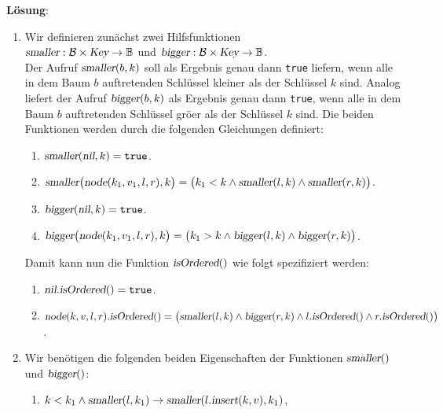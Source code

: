 \documentclass{article}
\newcommand{\solution}{\vspace*{0.2cm}

\noindent
\textbf{L\"osung}: }
\begin{document}
\solution
\begin{enumerate}
\item Wir definieren zun\"achst zwei Hilfsfunktionen
      \\[0.2cm]
      \hspace*{1.3cm} 
      $\textsl{smaller}: \mathcal{B} \times \textsl{Key} \rightarrow \mathbb{B}$ 
      \quad und \quad
      $\textsl{bigger}: \mathcal{B} \times \textsl{Key} \rightarrow \mathbb{B}$.
      \\[0.2cm]
      Der Aufruf $\textsl{smaller}(b,k)$ soll als Ergebnis genau dann \texttt{true}
      liefern, wenn alle in dem Baum $b$ auftretenden Schl\"ussel kleiner als der Schl\"ussel
      $k$ sind.  Analog liefert der Aufruf $\textsl{bigger}(b,k)$  als Ergebnis genau dann \texttt{true},
      wenn alle in dem Baum $b$ auftretenden Schl\"ussel gr\"o\3er als der Schl\"ussel
      $k$ sind.  Die beiden Funktionen werden durch die folgenden Gleichungen definiert:
      \begin{enumerate}
      \item $\textsl{smaller}(\textsl{nil}, k) = \mathtt{true}$.
      \item $\textsl{smaller}\bigl(\textsl{node}(k_1,v_1,l,r), k\bigr) = 
             \bigl(k_1 < k \wedge \textsl{smaller}(l, k) \wedge \textsl{smaller}(r, k)\bigr)$.
      \item $\textsl{bigger}(\textsl{nil}, k) = \mathtt{true}$.
      \item $\textsl{bigger}\bigl(\textsl{node}(k_1,v_1,l,r), k\bigr) = 
             \bigl(k_1 > k \wedge \textsl{bigger}(l, k) \wedge \textsl{bigger}(r, k)\bigr)$.
      \end{enumerate}
      Damit kann nun die Funktion $\textsl{isOrdered}()$ wie folgt spezifiziert werden:
      \begin{enumerate}
      \item $\textsl{nil}.\textsl{isOrdered}() = \mathtt{true}$.
      \item $\textsl{node}(k,v,l,r).\textsl{isOrdered}() = 
             \bigl(\textsl{smaller}(l, k) \wedge \textsl{bigger}(r, k) 
             \wedge l.\textsl{isOrdered}() \wedge r.\textsl{isOrdered}()\bigr)
            $.
      \end{enumerate}
\item Wir ben\"otigen die folgenden beiden Eigenschaften der Funktionen $\textsl{smaller}()$ und
      $\textsl{bigger}()$:
      \begin{enumerate}
      \item $k < k_1 \wedge \textsl{smaller}(l,k_1) \rightarrow \textsl{smaller}(l.\textsl{insert}(k,v),k_1)$,

\end{enumerate}
\end{enumerate}
\end{document}
